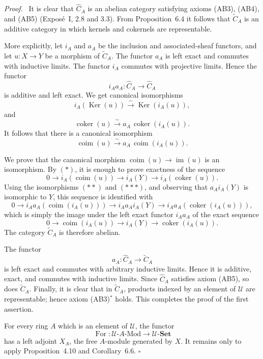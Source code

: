 \documentclass[11pt]{article}
\newcommand{\U}{\mathcal{U}}
\newcommand{\Set}{\mathbf{Set}}
\newcommand{\Ker}{\operatorname{Ker}}
\newcommand{\im}{\operatorname{im}}
\newcommand{\coim}{\operatorname{coim}}
\newcommand{\coker}{\operatorname{coker}}
\newcommand{\qedtext}{\hfill\(\square\)}
\newenvironment{prooftext}{\par\noindent\emph{Proof.}\ }{\par\medskip}
\begin{document}
\begin{prooftext}
It is clear that \(\widehat C_A\) is an abelian category satisfying axioms (AB3), (AB4), and (AB5) (Expos\'e~I, 2.8 and 3.3). From Proposition~6.4 it follows that \(\widetilde C_A\) is an additive category in which kernels and cokernels are representable.

More explicitly, let \(i_A\) and \(a_A\) be the inclusion and associated-sheaf functors, and let \(u:X\to Y\) be a morphism of \(\widetilde C_A\). The functor \(a_A\) is left exact and commutes with inductive limits. The functor \(i_A\) commutes with projective limits. Hence the functor
\[
i_Aa_A:\widehat C_A\to \widehat C_A
\]
is additive and left exact. We get canonical isomorphisms
\[
i_A(\Ker(u))\xrightarrow{\sim}\Ker(i_A(u)),
\tag{*}
\]
and
\[
\coker(u)\xrightarrow{\sim}a_A\,\coker(i_A(u)).
\tag{**}
\]
It follows that there is a canonical isomorphism
\[
\coim(u)\xrightarrow{\sim}a_A\,\coim(i_A(u)).
\tag{***}
\]

We prove that the canonical morphism \(\coim(u)\to\im(u)\) is an isomorphism. By \((*)\), it is enough to prove exactness of the sequence
\[
0\longrightarrow i_A(\coim(u))\longrightarrow i_A(Y)\longrightarrow i_A(\coker(u)).
\]
Using the isomorphisms \((**)\) and \((***)\), and observing that \(a_Ai_A(Y)\) is isomorphic to \(Y\), this sequence is identified with
\[
0\longrightarrow i_Aa_A(\coim(i_A(u)))\longrightarrow i_Aa_Ai_A(Y)\longrightarrow i_Aa_A(\coker(i_A(u))),
\]
which is simply the image under the left exact functor \(i_Aa_A\) of the exact sequence
\[
0\longrightarrow \coim(i_A(u))\longrightarrow i_A(Y)\longrightarrow \coker(i_A(u)).
\]
The category \(\widetilde C_A\) is therefore abelian.

The functor
\[
a_A:\widehat C_A\to\widetilde C_A
\]
is left exact and commutes with arbitrary inductive limits. Hence it is additive, exact, and commutes with inductive limits. Since \(\widehat C_A\) satisfies axiom (AB5), so does \(\widetilde C_A\). Finally, it is clear that in \(\widetilde C_A\), products indexed by an element of \(\U\) are representable; hence axiom (AB3)\({}^{\ast}\) holds. This completes the proof of the first assertion.

For every ring \(A\) which is an element of \(\U\), the functor
\[
\operatorname{For}:\U\text{-}A\text{-}\mathrm{Mod}\longrightarrow \U\text{-}\Set
\]
has a left adjoint \(X_A\), the free \(A\)-module generated by \(X\). It remains only to apply Proposition~4.10 and Corollary~6.6. \qedtext
\end{prooftext}
\end{document}
